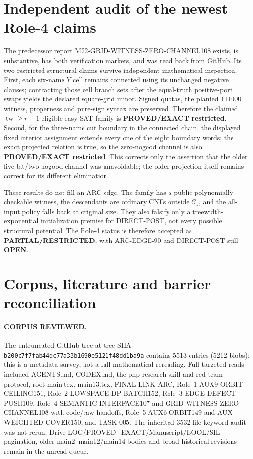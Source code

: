 \documentclass[11pt]{article}
\newcommand{\CS}{\mathcal C_\star}
\begin{document}
\section{Independent audit of the newest Role-4 claims}
The predecessor report M22-GRID-WITNESS-ZERO-CHANNEL108 exists, is substantive,
has both verification markers, and was read back from GitHub.  Its two
restricted structural claims survive independent mathematical inspection.
First, each six-name $Y$ cell remains connected using its unchanged negative
clauses; contracting those cell branch sets after the equal-truth positive-port
swaps yields the declared square-grid minor.  Signed quotas, the planted
$111000$ witness, properness and pure-sign syntax are preserved.  Therefore
the claimed $\operatorname{tw}\ge r-1$ eligible easy-SAT family is
\textbf{PROVED/EXACT restricted}.  Second, for the three-name cut boundary in
the connected chain, the displayed fixed interior assignment extends every
one of the eight boundary words; the exact projected relation is true, so the
zero-nogood channel is also \textbf{PROVED/EXACT restricted}.  This corrects
only the assertion that the older five-bit/two-nogood channel was unavoidable;
the older projection itself remains correct for its different elimination.

These results do not fill an ARC edge.  The family has a public polynomially
checkable witness, the descendants are ordinary CNFs outside $\CS$, and the
all-input policy falls back at original size.  They also falsify only a
treewidth-exponential initialization premise for DIRECT-POST, not every
possible structural potential.  The Role-4 status is therefore accepted as
\textbf{PARTIAL/RESTRICTED}, with ARC-EDGE-90 and DIRECT-POST still
\textbf{OPEN}.

\section{Corpus, literature and barrier reconciliation}
\paragraph{CORPUS REVIEWED.}
The untruncated GitHub tree at tree SHA
\texttt{b200c7f7fab44dc77a33b1690e5121f48dd1ba9a} contains 5513 entries
(5212 blobs); this is a metadata survey, not a full mathematical rereading.
Full targeted reads included AGENTS.md, CODEX.md, the pnp-research skill and
red-team protocol, root main.tex, main13.tex, FINAL-LINK-ARC, Role~1
AUX9-ORBIT-CEILING151, Role~2 LOWSPACE-DP-BATCH152, Role~3
EDGE-DEFECT-PUSH109, Role~4 SEMANTIC-INTERFACE107 and
GRID-WITNESS-ZERO-CHANNEL108 with code/raw handoffs, Role~5 AUX6-ORBIT149 and
AUX-WEIGHTED-COVER150, and TASK-005.  The inherited 3532-file keyword audit
was not rerun.  Drive LOG/PROVED\_EXACT/Manuscript/BOOL/SIL pagination,
older main2--main12/main14 bodies and broad historical revisions remain in the
unread queue.
\end{document}
